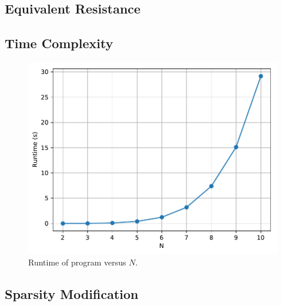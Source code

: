 \documentclass[a4paper,titlepage]{article}
\begin{document}
	\subsection{Equivalent Resistance}
	
	\subsection{Time Complexity}
	
	\begin{figure}[!htb]
		\centering
		\includegraphics[width=\columnwidth]{plots/q2b.pdf}
		\caption
		{Runtime of program versus $N$.}
		\label{fig:q2b}
	\end{figure}
	
	\subsection{Sparsity Modification}
	
\end{document}
